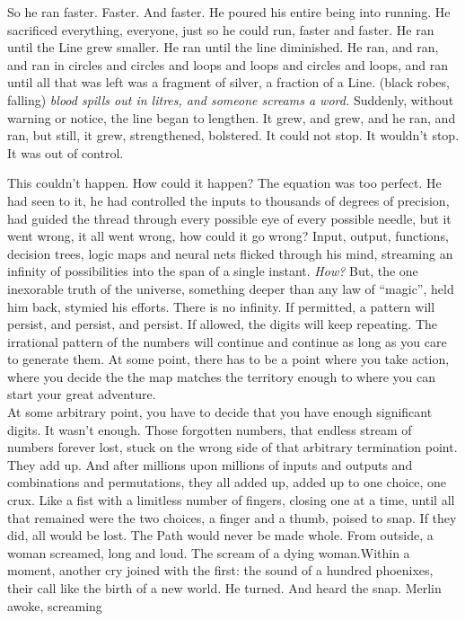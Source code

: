 So he ran faster. Faster. And faster. He poured his entire being into running. He sacrificed everything, everyone, just so he could run, faster and faster. He ran until the Line grew smaller. He ran until the line diminished. He ran, and ran, and ran in circles and circles and loops and loops and circles and loops, and ran until all that was left was a fragment of silver, a fraction of a Line.
\SmallVSpace
(black robes, falling)
\SmallVSpace
\emph{{\el}blood spills out in litres, and someone screams a word.}
\SmallVSpace
Suddenly, without warning or notice, the line began to lengthen. It grew, and grew, and he ran, and ran, but still, it grew, strengthened, bolstered. It could not stop. It wouldn’t stop. It was out of control.

This couldn’t happen. How could it happen? The equation was too perfect. He had seen to it, he had controlled the inputs to thousands of degrees of precision, had guided the thread through every possible eye of every possible needle, but it went wrong, it all went wrong, how could it go wrong? Input, output, functions, decision trees, logic maps and neural nets flicked through his mind, streaming an infinity of possibilities into the span of a single instant. \emph{How?}
\SmallVSpace
But, the one inexorable truth of the universe, something deeper than any law of “magic”, held him back, stymied his efforts. There is no infinity. If permitted, a pattern will persist, and persist, and persist. If allowed, the digits will keep repeating. The irrational pattern of the numbers will continue and continue as long as you care to generate them. At some point, there has to be a point where you take action, where you decide the the map matches the territory enough to where you can start your great adventure.\\At some arbitrary point, you have to decide that you have enough significant digits.
\SmallVSpace
It wasn’t enough.
\SomeVSpace
Those forgotten numbers, that endless stream of numbers forever lost, stuck on the wrong side of that arbitrary termination point. They add up. And after millions upon millions of inputs and outputs and combinations and permutations, they all added up, added up to one choice, one crux. Like a fist with a limitless number of fingers, closing one at a time, until all that remained were the two choices, a finger and a thumb, poised to snap. If they did, all would be lost. The Path would never be made whole. From outside, a woman screamed, long and loud. The scream of a dying woman.Within a moment, another cry joined with the first: the sound of a hundred phoenixes, their call like the birth of a new world.
\SomeVSpace
He turned.
\SmallVSpace
And heard the snap.
\SmallVSpace
Merlin awoke, screaming

